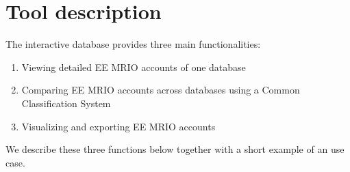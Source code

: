 \section{Tool description}

The interactive database provides three main functionalities:

\begin{enumerate}
\item Viewing detailed EE MRIO accounts of one database
\item Comparing EE MRIO accounts across databases using a Common Classification System
\item Visualizing and exporting EE MRIO accounts
\end{enumerate}

We describe these three functions below together with a short example of an use case.
